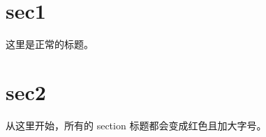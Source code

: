 \startdocument

\section{sec1}
这里是正常的标题。

\setuphead[section][color=red, style=\tfc]

\section{sec2}
从这里开始，所有的 section 标题都会变成红色且加大字号。

\stopdocument